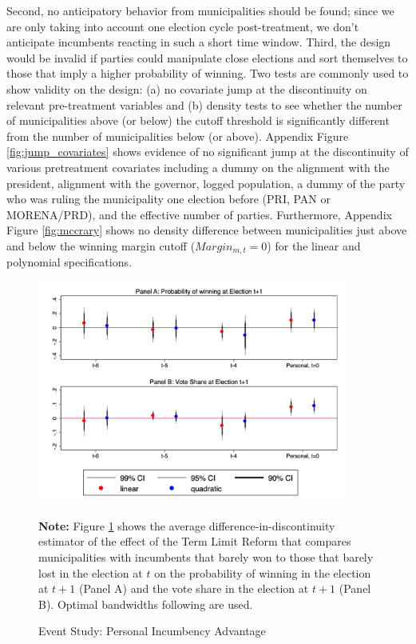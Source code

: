 \documentclass[12pt]{amsart}
\numberwithin{equation}{section}
\theoremstyle{definition}
\theoremstyle{definition}
\theoremstyle{definition}
\begin{document}
Second, no anticipatory behavior from municipalities should be found; since we are only taking into account one election cycle post-treatment, we don't anticipate incumbents reacting in such a short time window. Third, the design would be invalid if parties could manipulate close elections and sort themselves to those that imply a higher probability of winning. Two tests are commonly used to show validity on the design: (a) no covariate jump at the discontinuity on relevant pre-treatment variables and (b) density tests to see whether the number of municipalities above (or below) the cutoff threshold is significantly different from the number of municipalities below (or above). Appendix Figure \ref{fig:jump_covariates} shows evidence of no significant jump at the discontinuity of various pretreatment covariates including a dummy on the alignment with the president, alignment with the governor, logged population, a dummy of the party who was ruling the municipality one election before (PRI, PAN or MORENA/PRD), and the effective number of parties. Furthermore, Appendix Figure \ref{fig:mccrary} shows no density difference between municipalities just above and below the winning margin cutoff ($Margin_{m,t}=0$) for the linear and polynomial specifications. 

\begin{figure}[H]   
\centering    
 \caption{Event Study: Personal Incumbency Advantage}
 \label{fig:event_study_personal}
\includegraphics[width=0.9\textwidth]{Figures_incumbency/event_study.png}
       \captionsetup{justification=centering}
         
 \textbf{Note:} Figure \ref{fig:event_study_personal} shows the average difference-in-discontinuity estimator of the effect of the Term Limit Reform that compares municipalities with incumbents that barely won to those that barely lost in the election at $t$ on the probability of winning in the election at $t+1$ (Panel A) and the vote share in the  election at $t+1$ (Panel B). Optimal bandwidths following \citet{calonicoetal_2014} are used. 
  
\end{figure}  
 
\end{document}
